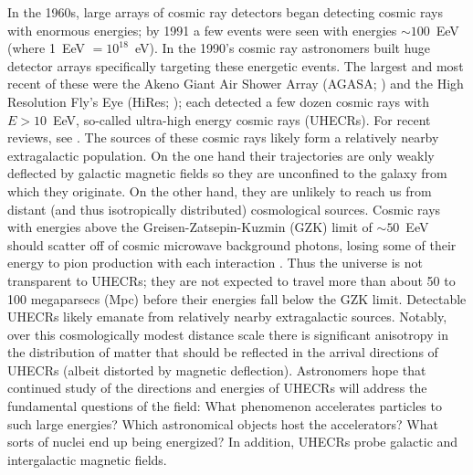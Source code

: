 In the 1960s, large arrays of cosmic ray detectors began detecting cosmic rays
with enormous energies; by 1991 a few events were seen with energies $\sim
100$~EeV (where 1~EeV $=10^{18}$~eV). In the 1990's cosmic ray astronomers
built huge detector arrays specifically targeting these energetic events.  The
largest and most recent of these were the Akeno Giant Air Shower Array (AGASA;
\cite{1992APh.....1...27C}) and the High Resolution Fly's Eye (HiRes;
\cite{2002NIMPA.482..457B}); each detected a few dozen cosmic rays with
$E>10$~EeV, so-called ultra-high energy cosmic rays (UHECRs). For recent
reviews, see \cite{KO11-UHECRs,LS11-UHECRs}.  The sources of
these cosmic rays likely form a relatively nearby extragalactic population. On
the one hand their trajectories are only weakly deflected by galactic magnetic
fields so they are unconfined to the galaxy from which they originate.  On the
other hand, they are unlikely to reach us from distant (and thus isotropically
distributed) cosmological sources.  Cosmic rays with energies above the
Greisen-Zatsepin-Kuzmin (GZK) limit of $\sim 50$~EeV  should scatter off of
cosmic microwave background photons, losing some of their energy to pion
production with each interaction
\cite{G66-GZK,ZK66-GZK}. Thus the universe is not
transparent to UHECRs; they are not expected to travel more than about 50 to
100 megaparsecs (Mpc) before their energies fall below the GZK limit. 
Detectable UHECRs likely emanate from relatively nearby extragalactic sources.
 Notably, over this cosmologically modest distance scale there is significant
anisotropy in the distribution of matter that should be reflected in the
arrival directions of UHECRs (albeit distorted by magnetic deflection). 
Astronomers hope that continued study of the directions and energies of UHECRs
will address the fundamental questions of the field: What phenomenon
accelerates particles to such large energies?  Which astronomical objects host
the accelerators?  What sorts of nuclei end up being energized?  In
addition, UHECRs probe galactic and intergalactic magnetic fields.

